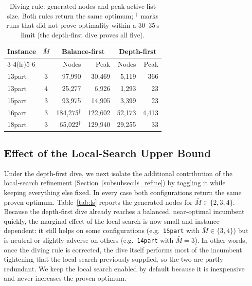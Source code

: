 \documentclass[review,3p,times,authoryear]{elsarticle}
\begin{document}
\begin{table}[t]
	\centering
	\caption{Diving rule: generated nodes and peak active-list size. Both rules
		return the same optimum; $^\dagger$ marks runs that did not prove optimality
		within a $30$--$35$\,s limit (the depth-first dive proves all five).}
	\label{tab:dive}
	\begin{tabular}{l c r r r r}
		\toprule
		\multirow{2}{*}{Instance} & \multirow{2}{*}{$\bar M$}
		& \multicolumn{2}{c}{Balance-first} & \multicolumn{2}{c}{Depth-first} \\
		\cmidrule(lr){3-4}\cmidrule(lr){5-6}
		& & Nodes & Peak & Nodes & Peak \\
		\midrule
		13part & 3 & 97{,}990            & 30{,}469  & 5{,}119  & 366 \\
		13part & 4 & 25{,}277            & 6{,}926   & 1{,}293  & 23 \\
		15part & 3 & 93{,}975            & 14{,}905  & 3{,}399  & 23 \\
		16part & 3 & 184{,}275$^\dagger$ & 122{,}602 & 52{,}173 & 4{,}413 \\
		18part & 3 & 65{,}022$^\dagger$  & 129{,}940 & 29{,}255 & 33 \\
		\bottomrule
	\end{tabular}
\end{table}

\subsection{Effect of the Local-Search Upper Bound}
\label{subsec:res_ls}

Under the depth-first dive, we next isolate the additional contribution of the
local-search refinement (Section~\ref{subsubsec:ls_refine}) by toggling it while
keeping everything else fixed. In every case both configurations return the same
proven optimum. Table~\ref{tab:ls} reports the generated nodes for
$\bar M\in\{2,3,4\}$. Because the depth-first dive already reaches a balanced,
near-optimal incumbent quickly, the marginal effect of the local search is now
small and instance dependent: it still helps on some configurations (e.g.\
\texttt{15part} with $\bar M\in\{3,4\}$) but is neutral or slightly adverse on
others (e.g.\ \texttt{14part} with $\bar M=3$). In other words, once the diving
rule is corrected, the dive itself performs most of the incumbent tightening that
the local search previously supplied, so the two are partly redundant. We keep
the local search enabled by default because it is inexpensive and never increases
the proven optimum.
\end{document}

